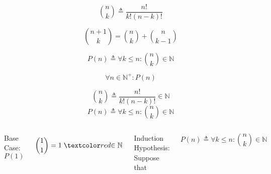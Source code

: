 \begin{frame}{}
  \[
    {n \choose k} \triangleq \frac{n!}{k! (n-k)!}
  \]

  \pause
  \vspace{0.60cm}
  \[
    {n+1 \choose k} = {n \choose k} + {n \choose k-1}
  \]

  \pause
  \vspace{0.30cm}
  \begin{center}
  \end{center}

  \pause
  \[
    P(n) \triangleq \forall k \le n: {n \choose k} \in \mathbb{N}
  \]

  \pause
  \[
    \forall n \in \mathbb{N}^{+}: P(n)
  \]
\end{frame}

\begin{frame}
  \[
    {n \choose k} \triangleq \frac{n!}{k! (n-k)!} \in \mathbb{N}
  \]
  \[
    P(n) \triangleq \forall k \le n: {n \choose k} \in \mathbb{N}
  \]

  \begin{center}
  \end{center}

  \vspace{0.30cm}
  \begin{columns}
      \pause
      \begin{center}
	Base Case: $P(1)$
      \end{center}
      \[
	{1 \choose 1} = 1 \;\red{\in \mathbb{N}}
      \]
      \pause
      \begin{center}
	Induction Hypothesis: Suppose that
      \end{center}
      \[
	P(n) \triangleq \forall k \le n: {n \choose k} \in \mathbb{N}
      \]
  \end{columns}
\end{frame}

